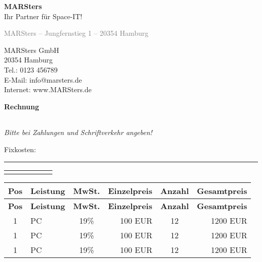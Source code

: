 \documentclass[12pt,a4paper]{article}
\begin{document}
\noindent
\raggedleft
\Huge\textbf{MARSters} \\[0.3em]
\large Ihr Partner für Space-IT! \\
\vspace{2em}
\begin{minipage}[t]{0.5\textwidth}
{\small \textcolor{gray}{MARSters – Jungfernstieg 1 – 20354 Hamburg}} \\[1em]

\end{minipage}
\hfill
\begin{minipage}[t]{0.45\textwidth}
\raggedleft
\vspace{1em}
MARSters GmbH \\
20354 Hamburg \\
Tel.: 0123 456789 \\
E-Mail: info@marsters.de \\
Internet: www.MARSters.de
\end{minipage}

\vspace{1.8em}

\textbf{\LARGE Rechnung}

\vspace{1em}
\begin{tabularx}{\textwidth}{@{}l X r@{}}

\end{tabularx}

\small\textit{Bitte bei Zahlungen und Schriftverkehr angeben!}

\vspace{1em}
Fixkosten:
\rule{\textwidth}{0.5pt}

\renewcommand{\arraystretch}{1.4}
\begin{tabularx}{\textwidth}{|c|X|c|r|c|r|}
\hline
\rowcolor{gray!30}


\end{tabularx}
\vspace{8.5em}



\renewcommand{\arraystretch}{1.4}
\begin{longtable}{|c|p{6cm}|c|r|c|r|}
\hline
\rowcolor{gray!30}
\textbf{Pos} & \textbf{Leistung} & \textbf{MwSt.} & \textbf{Einzelpreis} & \textbf{Anzahl} & \textbf{Gesamtpreis} \\
\hline
\endfirsthead

\hline
\rowcolor{gray!30}
\textbf{Pos} & \textbf{Leistung} & \textbf{MwSt.} & \textbf{Einzelpreis} & \textbf{Anzahl} & \textbf{Gesamtpreis} \\
\hline
\endhead

1 & PC & 19\% & 100 EUR & 12 & 1200 EUR \\
\hline
1 & PC & 19\% & 100 EUR & 12 & 1200 EUR \\
\hline
1 & PC & 19\% & 100 EUR & 12 & 1200 EUR \\
\hline
\end{longtable}
\end{document}
